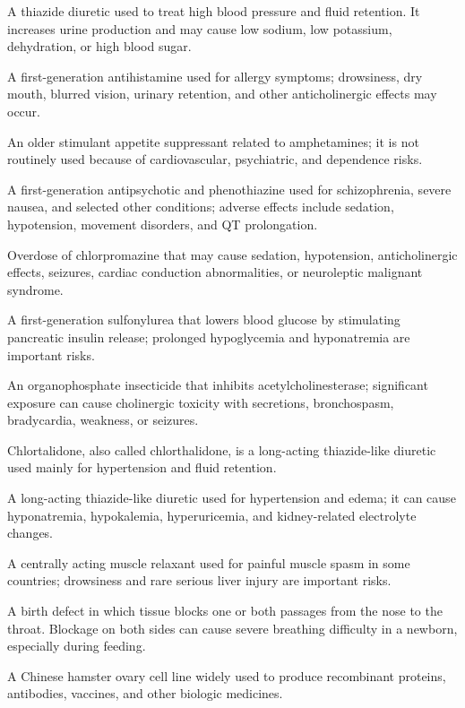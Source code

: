  A thiazide diuretic used to treat high blood pressure and fluid retention. It increases urine production and may cause low sodium, low potassium, dehydration, or high blood sugar.

 A first-generation antihistamine used for allergy symptoms; drowsiness, dry mouth, blurred vision, urinary retention, and other anticholinergic effects may occur.

 An older stimulant appetite suppressant related to amphetamines; it is not routinely used because of cardiovascular, psychiatric, and dependence risks.

 A first-generation antipsychotic and phenothiazine used for schizophrenia, severe nausea, and selected other conditions; adverse effects include sedation, hypotension, movement disorders, and QT prolongation.

 Overdose of chlorpromazine that may cause sedation, hypotension, anticholinergic effects, seizures, cardiac conduction abnormalities, or neuroleptic malignant syndrome.

 A first-generation sulfonylurea that lowers blood glucose by stimulating pancreatic insulin release; prolonged hypoglycemia and hyponatremia are important risks.

 An organophosphate insecticide that inhibits acetylcholinesterase; significant exposure can cause cholinergic toxicity with secretions, bronchospasm, bradycardia, weakness, or seizures.

 Chlortalidone, also called chlorthalidone, is a long-acting thiazide-like diuretic used mainly for hypertension and fluid retention.

 A long-acting thiazide-like diuretic used for hypertension and edema; it can cause hyponatremia, hypokalemia, hyperuricemia, and kidney-related electrolyte changes.

 A centrally acting muscle relaxant used for painful muscle spasm in some countries; drowsiness and rare serious liver injury are important risks.

 A birth defect in which tissue blocks one or both passages from the nose to the throat. Blockage on both sides can cause severe breathing difficulty in a newborn, especially during feeding.

 A Chinese hamster ovary cell line widely used to produce recombinant proteins, antibodies, vaccines, and other biologic medicines.

